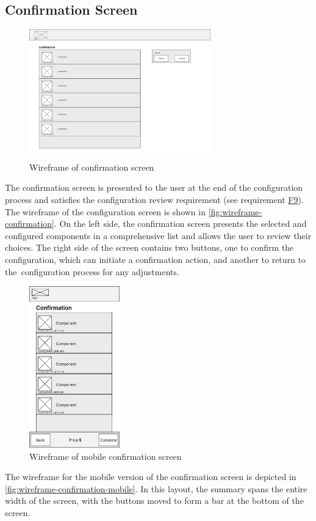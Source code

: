 \subsection{Confirmation Screen}

\begin{figure}[hb]
\centering
\includegraphics[width=0.7\textwidth]{images/wireframe_confirmation_default.png}
\caption{Wireframe of confirmation screen}
\label{fig:wireframe-confirmation}
\end{figure}

The confirmation screen is presented to the user at the end of the configuration process and satisfies the configuration review requirement (see requirement \hyperref[itm:F9]{F9}). The wireframe of the configuration screen is shown in \autoref{fig:wireframe-confirmation}. On the left side, the confirmation screen presents the selected and configured components in a comprehensive list and allows the user to review their choices. The right side of the screen contains two buttons, one to confirm the configuration, which can initiate a confirmation action, and another to return to the~configuration process for any adjustments. 

\begin{figure}[htb]
\centering
\includegraphics[width=0.35\textwidth]{images/wireframe_confirmation_mobile_default.png}
\caption{Wireframe of mobile confirmation screen}
\label{fig:wireframe-confirmation-mobile}
\end{figure}

The wireframe for the mobile version of the confirmation screen is depicted in  \autoref{fig:wireframe-confirmation-mobile}. In this layout, the summary spans the entire width of the screen, with the buttons moved to form a bar at the bottom of the screen.